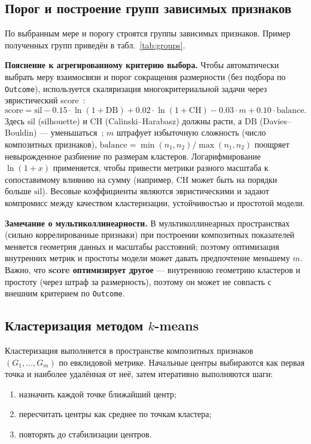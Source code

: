 \documentclass[a4paper, 14pt]{extarticle}
\begin{document}
\subsection{Порог и построение групп зависимых признаков}
По выбранным мере и порогу строятся группы зависимых признаков. Пример полученных групп приведён в табл.~\ref{tab:groups}.

\medskip
\textbf{Пояснение к агрегированному критерию выбора.}
Чтобы автоматически выбрать меру взаимосвязи и порог сокращения размерности (без подбора по \texttt{Outcome}), используется скаляризация многокритериальной задачи через эвристический score~\cite{podinovskiy2013}:
\[
\mathrm{score}=\mathrm{sil}-0.15\cdot\ln(1+\mathrm{DB})+0.02\cdot\ln(1+\mathrm{CH})-0.03\cdot m+0.10\cdot \mathrm{balance}.
\]
Здесь \(\mathrm{sil}\) (silhouette) и \(\mathrm{CH}\) (Calinski--Harabasz) должны расти, а \(\mathrm{DB}\) (Davies--Bouldin) --- уменьшаться~\cite{sklearn2026}; \(m\) штрафует избыточную сложность (число композитных признаков), \(\mathrm{balance}=\min(n_1,n_2)/\max(n_1,n_2)\) поощряет невырожденное разбиение по размерам кластеров. Логарифмирование \(\ln(1+x)\) применяется, чтобы привести метрики разного масштаба к сопоставимому влиянию на сумму (например, \(\mathrm{CH}\) может быть на порядки больше \(\mathrm{sil}\)). Весовые коэффициенты являются эвристическими и задают компромисс между качеством кластеризации, устойчивостью и простотой модели.

\medskip
\textbf{Замечание о мультиколлинеарности.}
В мультиколлинеарных пространствах (сильно коррелированные признаки) при построении композитных показателей меняется геометрия данных и масштабы расстояний; поэтому оптимизация внутренних метрик и простоты модели может давать предпочтение меньшему \(m\). Важно, что \textbf{score оптимизирует другое} — внутреннюю геометрию кластеров и простоту (через штраф за размерность), поэтому он может не совпасть с внешним критерием по \texttt{Outcome}.

\begin{table}[H]
\centering

\caption{Группы признаков после сокращения размерности}
\label{tab:groups}
\end{table}

\subsection{Кластеризация методом $k$-means}
Кластеризация выполняется в пространстве композитных признаков $(G_1,\dots,G_m)$ по евклидовой метрике. Начальные центры выбираются как первая точка и наиболее удалённая от неё, затем итеративно выполняются шаги:
\begin{enumerate}
  \item назначить каждой точке ближайший центр;
  \item пересчитать центры как среднее по точкам кластера;
  \item повторять до стабилизации центров.
\end{enumerate}
\end{document}
